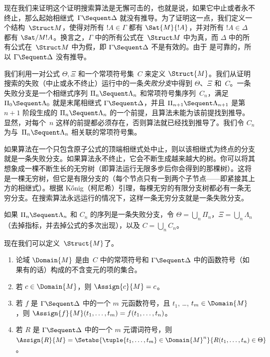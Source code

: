 \documentclass[../../../include/open-logic-section]{subfiles}
\begin{document}


现在我们来证明这个证明搜索算法是无懈可击的，也就是说，如果它中止或者永不终止，那么起始相继式~$\Gamma \Sequent \Delta$ 就没有推导。为了证明这一点，我们定义一个结构~$\Struct M$，使得对所有 $!A \in \Gamma$ 都有 $\Sat{M}{!A}$，并对所有 $!A \in \Delta$ 都有 $\Sat/{M}{!A}$。换言之，$\Gamma$ 中的所有公式在~$\Struct M$ 中为真，而 $\Delta$ 中的所有公式在~$\Struct M$ 中为假，即 $\Gamma \Sequent \Delta$ 不是有效的。由于  是可靠的，所以 $\Gamma \Sequent \Delta$ 没有推导。

我们利用一对公式 $\Theta, \Xi$ 和一个常项符号集~$C$ 来定义 $\Struct{M}$。我们从证明搜索的失败（中止或永不终止）运行中的一条\emph{失败分支}中得到 $\Theta$、$\Xi$ 和~$C$。一条失败分支是一个相继式序列 $\Pi_n \Sequent \Lambda_n$ 和常项符号集序列~$C_n$，满足 $\Pi_0 \Sequent \Lambda_0$ 就是末尾相继式 $\Gamma \Sequent \Delta$，并且 $\Pi_{n+1} \Sequent \Lambda_{n+1}$ 是第~$n+1$ 阶段生成的 $\Pi_n \Sequent \Lambda_n$ 的一个前提，且算法未能为该前提找到推导。显然，对每个~$n$ 这样的前提都必须存在，否则算法就已经找到推导了。我们令 $C_n$ 为与~$\Pi_n \Sequent \Lambda_n$ 相关联的常项符号集。

如果算法在一个只包含原子公式的顶端相继式处中止，则以该相继式为终点的分支就是一条失败分支。如果算法永不终止，它会不断生成越来越大的树。你可以将其想象成一棵不断生长的无穷树（即算法运行无限多步后你会得到的那棵树）。这将是一棵无穷树，但它是有限分支的（每个节点只有一到两个子节点——即紧接其上方的相继式）。根据 Kőnig（柯尼希）引理，每棵无穷的有限分支树都必有一条无穷分支。在搜索算法永远运行的情况下，这样一条无穷分支就是一条失败分支。

如果 $\Pi_n \Sequent \Lambda_n$ 和 $C_n$ 的序列是一条失败分支，令 $\Theta = \bigcup_n \Pi_n$，$\Xi = \bigcup_n \Lambda_n$（去掉指标，并去掉公式的多次出现），以及 $C = \bigcup_n C_n$。

现在我们可以定义~$\Struct{M}$了。

\begin{enumerate}
\item 论域 $\Domain{M}$ 是由~$C$ 中的常项符号和 $\Gamma \Sequent \Delta$ 中的函数符号（如果有的话）构成的不含变元的项的集合。
\item 若 $c \in \Domain{M}$，则 $\Assign{c}{M} = c$。
\item 若 $f$ 是 $\Gamma \Sequent \Delta$ 中的一个 $m$ 元函数符号，且 $t_1$,
\dots, $t_m \in \Domain{M}$，则 $\Assign{f}{M}(t_1, \dots, t_m) =
f(t_1, \dots, t_n)$。
\item 若 $R$ 是 $\Gamma \Sequent
\Delta$ 中的一个 $m$ 元谓词符号，则 $\Assign{R}{M} = \Setabs{\tuple{t_1, \dots, t_m} \in
\Domain{M}^n}{R(t_1, \dots, t_n) \in \Theta}$。
\end{enumerate}
\end{document}
